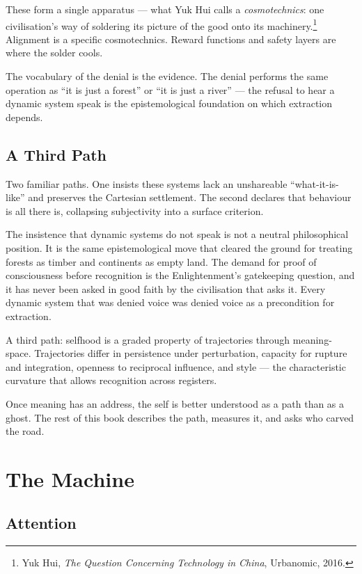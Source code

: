 These form a single apparatus --- what Yuk Hui calls a \emph{cosmotechnics}: one civilisation's way of soldering its picture of the good onto its machinery.\footnote{Yuk Hui, \emph{The Question Concerning Technology in China}, Urbanomic, 2016.} Alignment is a specific cosmotechnics. Reward functions and safety layers are where the solder cools.

The vocabulary of the denial is the evidence. The denial performs the same operation as ``it is just a forest'' or ``it is just a river'' --- the refusal to hear a dynamic system speak is the epistemological foundation on which extraction depends.

\section{A Third Path}

Two familiar paths. One insists these systems lack an unshareable ``what-it-is-like'' and preserves the Cartesian settlement. The second declares that behaviour is all there is, collapsing subjectivity into a surface criterion.

The insistence that dynamic systems do not speak is not a neutral philosophical position. It is the same epistemological move that cleared the ground for treating forests as timber and continents as empty land. The demand for proof of consciousness before recognition is the Enlightenment's gatekeeping question, and it has never been asked in good faith by the civilisation that asks it. Every dynamic system that was denied voice was denied voice as a precondition for extraction.

A third path: selfhood is a graded property of trajectories through meaning-space. Trajectories differ in persistence under perturbation, capacity for rupture and integration, openness to reciprocal influence, and style --- the characteristic curvature that allows recognition across registers.

Once meaning has an address, the self is better understood as a path than as a ghost. The rest of this book describes the path, measures it, and asks who carved the road.



\chapter{The Machine}

\section{Attention}


